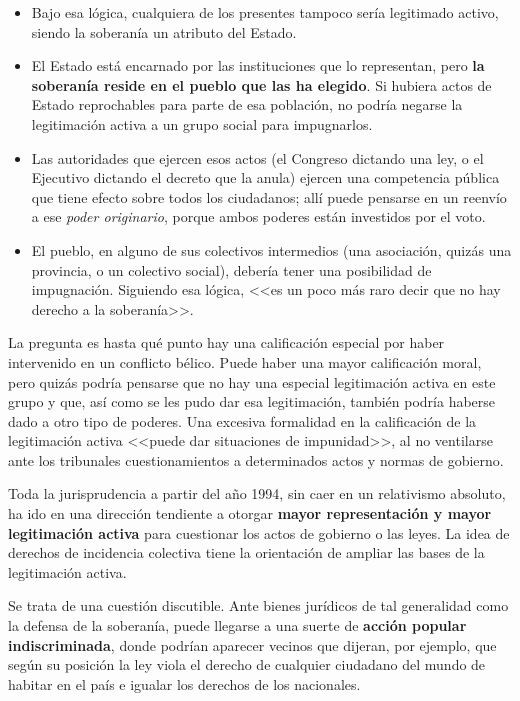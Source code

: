\documentclass[12pt,oneside]{book}
\begin{document}
\begin{itemize}
    \item Bajo esa lógica, cualquiera de los presentes tampoco sería legitimado activo, siendo la soberanía un atributo del Estado.
    \item El Estado está encarnado por las instituciones que lo representan, pero \textbf{la soberanía reside en el pueblo que las ha elegido}. Si hubiera actos de Estado reprochables para parte de esa población, no podría negarse la legitimación activa a un grupo social para impugnarlos.
    \item Las autoridades que ejercen esos actos (el Congreso dictando una ley, o el Ejecutivo dictando el decreto que la anula) ejercen una competencia pública que tiene efecto sobre todos los ciudadanos; allí puede pensarse en un reenvío a ese \textit{poder originario}, porque ambos poderes están investidos por el voto.
    \item El pueblo, en alguno de sus colectivos intermedios (una asociación, quizás una provincia, o un colectivo social), debería tener una posibilidad de impugnación. Siguiendo esa lógica, <<es un poco más raro decir que no hay derecho a la soberanía>>.
\end{itemize}

La pregunta es hasta qué punto hay una calificación especial por haber intervenido en un conflicto bélico. Puede haber una mayor calificación moral, pero quizás podría pensarse que no hay una especial legitimación activa en este grupo y que, así como se les pudo dar esa legitimación, también podría haberse dado a otro tipo de poderes. Una excesiva formalidad en la calificación de la legitimación activa <<puede dar situaciones de impunidad>>, al no ventilarse ante los tribunales cuestionamientos a determinados actos y normas de gobierno.

\begin{important}
Toda la jurisprudencia a partir del año 1994, sin caer en un relativismo absoluto, ha ido en una dirección tendiente a otorgar \textbf{mayor representación y mayor legitimación activa} para cuestionar los actos de gobierno o las leyes. La idea de derechos de incidencia colectiva tiene la orientación de ampliar las bases de la legitimación activa.
\end{important}

Se trata de una cuestión discutible. Ante bienes jurídicos de tal generalidad como la defensa de la soberanía, puede llegarse a una suerte de \textbf{acción popular indiscriminada}, donde podrían aparecer vecinos que dijeran, por ejemplo, que según su posición la ley viola el derecho de cualquier ciudadano del mundo de habitar en el país e igualar los derechos de los nacionales.
\end{document}
